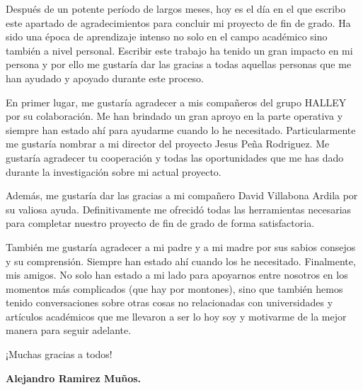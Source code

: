 
\newpage
\begin{multicols}{2}
\vfill\null
\begin{itshape}
\footnotesize
\hspace{5.7cm}
Después de un potente período de largos meses, hoy es el día en el que escribo este apartado de agradecimientos para concluir mi proyecto de fin de grado. Ha sido una época de aprendizaje intenso no solo en el campo académico sino también a nivel personal. Escribir este trabajo ha tenido un gran impacto en mi persona y por ello me gustaría dar las gracias a todas aquellas personas que me han ayudado y apoyado durante este proceso.

En primer lugar, me gustaría agradecer a mis compañeros del grupo HALLEY por su colaboración. Me han brindado un gran aproyo en la parte operativa y siempre han estado ahí para ayudarme cuando lo he necesitado. Particularmente me gustaría nombrar a mi director del proyecto Jesus Peña Rodriguez. Me gustaría agradecer tu cooperación y todas las oportunidades que me has dado durante la investigación sobre mi actual proyecto.

Además, me gustaría dar las gracias a mi compañero David Villabona Ardila por su valiosa ayuda. Definitivamente me ofrecidó todas las herramientas necesarias para completar nuestro proyecto de fin de grado de forma satisfactoria.

También me gustaría agradecer a mi padre y a mi madre por sus sabios consejos y su comprensión. Siempre han estado ahí cuando los he necesitado. Finalmente, mis amigos. No solo han estado a mi lado para apoyarnos entre nosotros en los momentos más complicados (que hay por montones), sino que también hemos tenido conversaciones sobre otras cosas no relacionadas con universidades y artículos académicos que me llevaron a ser lo hoy soy y motivarme de la mejor manera para seguir adelante.

¡Muchas gracias a todos!


\end{itshape}

\raggedleft
\normalsize \textbf{Alejandro Ramirez Muños.}
\end{multicols}
